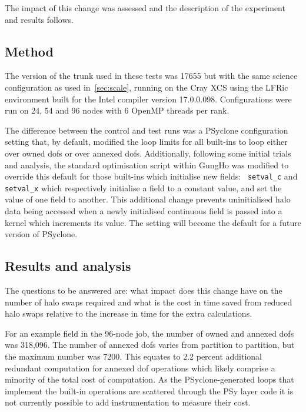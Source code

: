 The impact of this change was assessed and the description of the
experiment and results follows.

\subsection{Method}

The version of the trunk used in these tests was 17655 but with the same science configuration as
used in~\ref{sec:scale},
running on
the Cray XCS using the LFRic environment built for the Intel compiler
version 17.0.0.098. Configurations were run on 24, 54 and 96 nodes
with 6 OpenMP threads per rank. 

The difference between the control and test runs was a PSyclone
configuration setting that, by default, modified the loop limits for
all built-ins to loop either over owned dofs or over annexed dofs.
Additionally, following some initial trials and analysis, the standard
optimisation script within GungHo was modified to override this
default for those built-ins which initialise new fields: {\tt
  setval\_c} and {\tt setval\_x} which respectively initialise a field
to a constant value, and set the value of one field to another. This
additional change prevents uninitialised halo data being accessed when
a newly initialised continuous field is passed into a kernel which
increments its value. The setting will become the default for a future
version of PSyclone.

\subsection{Results and analysis}

The questions to be answered are: what impact does this change have on
the number of halo swaps required and what is the cost in time saved
from reduced halo swaps relative to the increase in time for the extra
calculations.

For an example field in the 96-node job, the number of owned and
annexed dofs was 318,096. The number of annexed dofs varies from
partition to partition, but the maximum number was 7200. This equates
to 2.2 percent additional redundant computation for annexed dof
operations which likely comprise a minority of the total cost of
computation. As the PSyclone-generated loops that implement the
built-in operations are scattered through the PSy layer code it is not
currently possible to add instrumentation to measure their cost.

